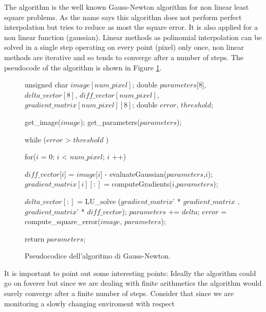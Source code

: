 The algorithm is the well known Gauss-Newton algorithm for non linear least square problems.
As the name says this algorithm does not perform perfect interpolation but tries to reduce as most the square error.
It is also applied for a non linear function (gaussian).
Linear methods as polinomial interpolation can be solved in a single step operating on every point (pixel) only once, non linear methods are iterative and so tends to converge after a  number of steps.
The pseudocode of the algorithm is shown in Figure \ref{code:gauss}.

\begin{figure}[h]
\begin{center} 
\begin{minipage}[c]{.85\textwidth} 
\centering 
\begin{pseudo}{}{}
unsigned char $image[num\_pixel]$;
double $parameters$[8], $delta\_vector[8]$, $diff\_vector[num\_pixel]$, $gradient\_matrix[num\_pixel][8]$;
double $error$, $threshold$;

get_image($image$);
get_parameters($parameters$);

while ($error$ > $threshold$ ) {
    for($i$ = 0; $i$ < $num\_pixel$; $i$ ++){
	
          $diff\_vector$[$i$] = $image$[$i$] - evaluateGaussian($parameters$,$i$); 
          $gradient\_matrix[i][:]$ = computeGradients($i$,$parameters$);
	      
    }
    
    $delta\_vector[:]$ = LU_solve ($gradient\_matrix$' * $gradient\_matrix$ , $gradient\_matrix$' * $diff\_vector$);
    $parameters$ += $delta$;
    $error$ = compute_square_error($image$, $parameters$);
}
return $parameters$;

\end{pseudo}
\end{minipage} 
\end{center} 
\caption{Pseudocodice dell'algoritmo di Gauss-Newton.}
\label{code:gauss}
\end{figure}

It is important to point out some interesting points:
Ideally the algorithm could go on foverer but since we are dealing with finite arithmetics the algorithm would surely converge after a finite number of steps.
Consider that since we are monitoring a slowly changing enviroment with respect